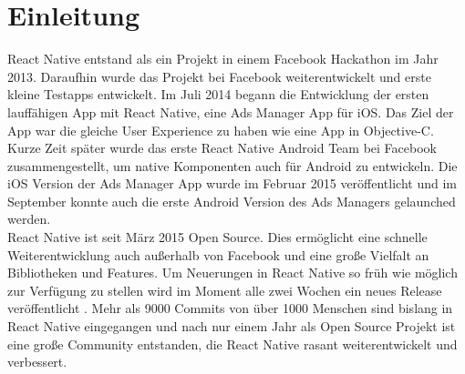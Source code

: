 \section{Einleitung}
React Native entstand als ein Projekt in einem Facebook Hackathon im Jahr 2013. Daraufhin wurde das Projekt bei Facebook weiterentwickelt und erste kleine Testapps entwickelt. Im Juli 2014 begann die Entwicklung der ersten lauffähigen App mit React Native, eine Ads Manager App für iOS. Das Ziel der App war die gleiche User Experience zu haben wie eine App in Objective-C. Kurze Zeit später wurde das erste React Native Android Team bei Facebook zusammengestellt, um native Komponenten auch für Android zu entwickeln. Die iOS Version der Ads Manager App wurde im Februar 2015 veröffentlicht und im September konnte auch die erste Android Version des Ads Managers gelaunched werden. \\

React Native ist seit März 2015 Open Source. Dies ermöglicht eine schnelle Weiterentwicklung auch außerhalb von Facebook und eine große Vielfalt an Bibliotheken und Features. Um Neuerungen in React Native so früh wie möglich zur Verfügung zu stellen wird im Moment alle zwei Wochen ein neues Release veröffentlicht \cite{Konicek_review_2016}. Mehr als 9000 Commits von über 1000 Menschen sind bislang in React Native eingegangen und nach nur einem Jahr als Open Source Projekt ist eine große Community entstanden, die React Native rasant weiterentwickelt und verbessert.